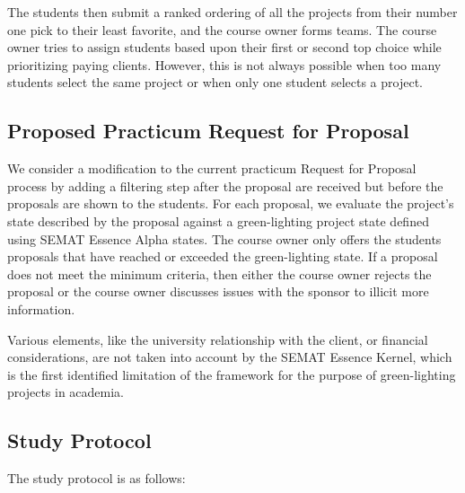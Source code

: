 \documentclass[conference]{IEEEtran}
\begin{document}
The students then submit a ranked ordering of all the projects from
their number one pick to their least favorite, and the course owner
forms teams. The course owner tries to assign students based upon their
first or second top choice while prioritizing paying clients. However,
this is not always possible when too many students select the same
project or when only one student selects a project.

\subsection{Proposed Practicum Request for Proposal}

We consider a modification to the current practicum Request for
Proposal process by adding a filtering step after the proposal are
received but before the proposals are shown to the students. For each
proposal, we evaluate the project's state described by the proposal
against a green-lighting project state defined using SEMAT Essence Alpha
states. The course owner only offers the students proposals that have
reached or exceeded the green-lighting state. If a proposal does not
meet the minimum criteria, then either the course owner rejects the
proposal or the course owner discusses issues with the sponsor to
illicit more information.

Various elements, like the university relationship with the client, or financial considerations, are not taken into account by the SEMAT Essence Kernel, which is the first identified limitation of the framework for the purpose of green-lighting projects in academia.

\subsection{Study Protocol}

The study protocol is as follows:
\end{document}
